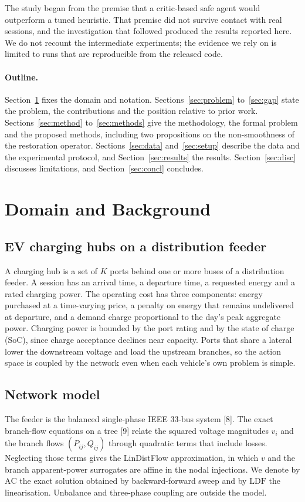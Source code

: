 \documentclass[11pt]{article}
\newcommand{\ldf}{\mathrm{LDF}}
\newcommand{\ac}{\mathrm{AC}}
\begin{document}
The study began from the premise that a critic-based safe agent would outperform a tuned heuristic. That premise did not survive contact with real sessions, and the investigation that followed produced the results reported here. We do not recount the intermediate experiments; the evidence we rely on is limited to runs that are reproducible from the released code.

\paragraph{Outline.} Section~\ref{sec:domain} fixes the domain and notation. Sections~\ref{sec:problem} to~\ref{sec:gap} state the problem, the contributions and the position relative to prior work. Sections~\ref{sec:method} to~\ref{sec:methods} give the methodology, the formal problem and the proposed methods, including two propositions on the non-smoothness of the restoration operator. Sections~\ref{sec:data} and~\ref{sec:setup} describe the data and the experimental protocol, and Section~\ref{sec:results} the results. Section~\ref{sec:disc} discusses limitations, and Section~\ref{sec:concl} concludes.

\section{Domain and Background}\label{sec:domain}
\subsection{EV charging hubs on a distribution feeder}
A charging hub is a set of $K$ ports behind one or more buses of a distribution feeder. A session has an arrival time, a departure time, a requested energy and a rated charging power. The operating cost has three components: energy purchased at a time-varying price, a penalty on energy that remains undelivered at departure, and a demand charge proportional to the day's peak aggregate power. Charging power is bounded by the port rating and by the state of charge (SoC), since charge acceptance declines near capacity. Ports that share a lateral lower the downstream voltage and load the upstream branches, so the action space is coupled by the network even when each vehicle's own problem is simple.

\subsection{Network model}
The feeder is the balanced single-phase IEEE 33-bus system [8]. The exact branch-flow equations on a tree [9] relate the squared voltage magnitudes $v_i$ and the branch flows $(P_{ij},Q_{ij})$ through quadratic terms that include losses. Neglecting those terms gives the LinDistFlow approximation, in which $v$ and the branch apparent-power surrogates are affine in the nodal injections. We denote by $\ac$ the exact solution obtained by backward-forward sweep and by $\ldf$ the linearisation. Unbalance and three-phase coupling are outside the model.
\end{document}
